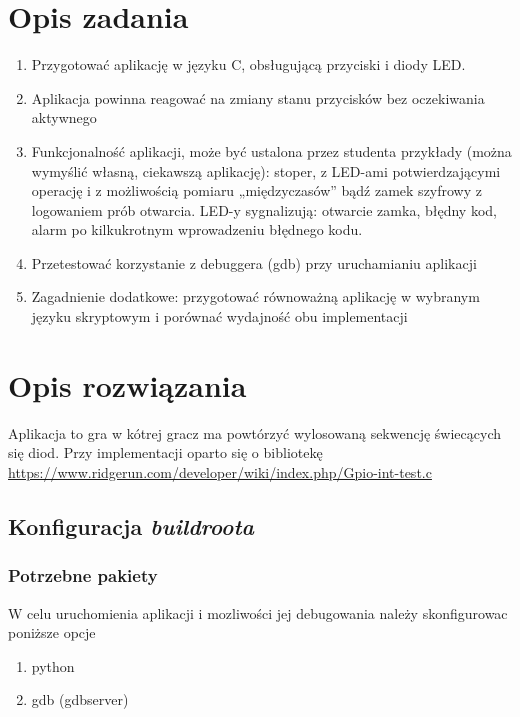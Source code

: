 
\usepackage{listings}

\maketitle
\tableofcontents

\newpage

\section{Opis zadania}
\begin{enumerate}
\item Przygotować aplikację w języku C, obsługującą przyciski i diody LED.
\item Aplikacja powinna reagować na zmiany stanu przycisków bez oczekiwania aktywnego
\item Funkcjonalność aplikacji, może być ustalona przez studenta przykłady
(można wymyślić własną, ciekawszą aplikację): stoper, z LED-ami potwierdzającymi operację i
z możliwością pomiaru „międzyczasów” bądź zamek szyfrowy z logowaniem prób otwarcia. LED-y sygnalizują:
otwarcie zamka, błędny kod, alarm po kilkukrotnym wprowadzeniu błędnego kodu.
\item Przetestować korzystanie z debuggera (gdb) przy uruchamianiu aplikacji
\item Zagadnienie dodatkowe: przygotować równoważną aplikację w wybranym języku skryptowym i porównać
wydajność obu implementacji
\end{enumerate}

\section{Opis rozwiązania}

Aplikacja to gra w kótrej gracz ma powtórzyć wylosowaną sekwencję
świecących się diod. Przy implementacji oparto się o 
bibliotekę \url{https://www.ridgerun.com/developer/wiki/index.php/Gpio-int-test.c}

\subsection{Konfiguracja \emph{buildroota}}
\subsubsection{Potrzebne pakiety}
W celu uruchomienia aplikacji i mozliwości jej debugowania należy skonfigurowac poniższe opcje
\begin{enumerate}
\item python
\item gdb (gdbserver)
\end{enumerate}
